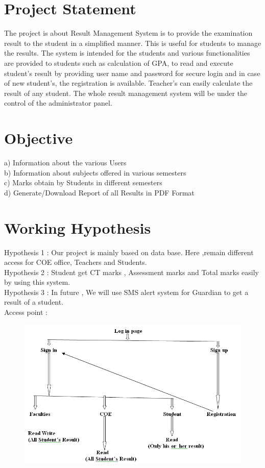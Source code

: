 \documentclass{article}
\begin{document}
	\begin{titlepage}

	
	
\section{Project Statement}\label{sec intro}
The project is about Result Management System is to provide the examination result to the student in a simplified manner. This is useful for students to manage the results. 
The system is intended for the students and various functionalities are provided to students such as calculation of GPA, to read and execute student’s result by providing user name and password for secure login and in case of new student’s, the registration is available. Teacher’s  can easily calculate  the result  of any student. The whole result management system will be under the control of the administrator panel. 


\section{Objective}\label{sec intro}
a)	Information about the various Users \\
b)	Information about subjects offered in various semesters \\
c)	Marks obtain by Students in different semesters\\
d)	Generate/Download Report of all Results in PDF Format\\




\section{Working Hypothesis}\label{oject}

Hypothesis 1 : Our project is mainly based on data base. Here ,remain different access for COE office, Teachers  and  Students. \\
Hypothesis 2 : Student get CT marks , Assessment marks and Total marks easily by using this system. \\
Hypothesis 3 : In future , We will use SMS alert system for Guardian to get a result of a student.
\\

\label{oject}
Access point :

\begin{figure}[h!]
\centering
\includegraphics[width=.9\textwidth]{Access.png}


\end{figure}
\end{titlepage}
\end{document}

